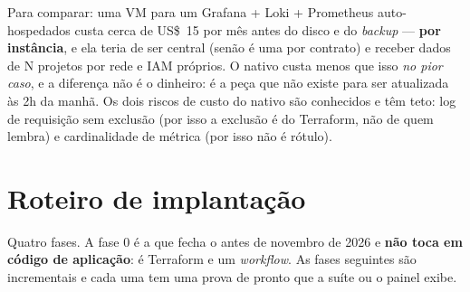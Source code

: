 \begin{nota}
Para comparar: uma VM  para um Grafana + Loki + Prometheus
auto-hospedados custa cerca de US\$~15 por mês antes do disco e do
\emph{backup} --- \textbf{por instância}, e ela teria de ser central (senão
é uma por contrato) e receber dados de N projetos por rede e IAM próprios.
O nativo custa menos que isso \emph{no pior caso}, e a diferença não é o
dinheiro: é a peça que não existe para ser atualizada às 2h da manhã. Os
dois riscos de custo do nativo são conhecidos e têm teto: log de requisição
sem exclusão (por isso a exclusão é do Terraform, não de quem lembra) e
cardinalidade de métrica (por isso  não é rótulo).
\end{nota}

\section{Roteiro de implantação}

Quatro fases. A fase 0 é a que fecha o  antes de novembro de 2026
e \textbf{não toca em código de aplicação}: é Terraform e um
\emph{workflow}. As fases seguintes são incrementais e cada uma tem uma
prova de pronto que a suíte ou o painel exibe.

